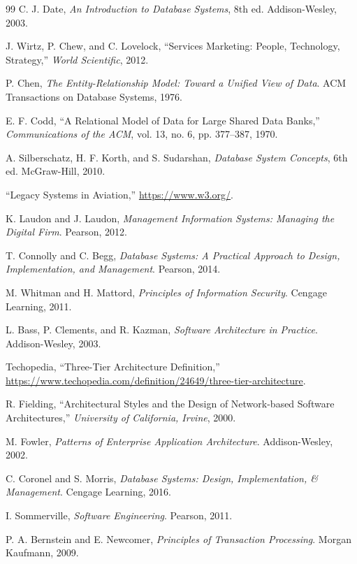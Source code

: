 \documentclass[12pt, a4paper]{article}
\begin{document}
\begin{thebibliography}{99}
		 C. J. Date, \textit{An Introduction to Database Systems}, 8th ed. Addison-Wesley, 2003.
		
		 J. Wirtz, P. Chew, and C. Lovelock, ``Services Marketing: People, Technology, Strategy,'' \textit{World Scientific}, 2012.
		
		 P. Chen, \textit{The Entity-Relationship Model: Toward a Unified View of Data}. ACM Transactions on Database Systems, 1976.
		
		 E. F. Codd, ``A Relational Model of Data for Large Shared Data Banks,'' \textit{Communications of the ACM}, vol. 13, no. 6, pp. 377--387, 1970.
		
		 A. Silberschatz, H. F. Korth, and S. Sudarshan, \textit{Database System Concepts}, 6th ed. McGraw-Hill, 2010.
		
		 ``Legacy Systems in Aviation,'' \url{https://www.w3.org/}.
		
		 K. Laudon and J. Laudon, \textit{Management Information Systems: Managing the Digital Firm}. Pearson, 2012.
		
		 T. Connolly and C. Begg, \textit{Database Systems: A Practical Approach to Design, Implementation, and Management}. Pearson, 2014.
		
		 M. Whitman and H. Mattord, \textit{Principles of Information Security}. Cengage Learning, 2011.
		
		 L. Bass, P. Clements, and R. Kazman, \textit{Software Architecture in Practice}. Addison-Wesley, 2003.
		
		 Techopedia, ``Three-Tier Architecture Definition,'' \url{https://www.techopedia.com/definition/24649/three-tier-architecture}.
		
		 R. Fielding, ``Architectural Styles and the Design of Network-based Software Architectures,'' \textit{University of California, Irvine}, 2000.
		
		 M. Fowler, \textit{Patterns of Enterprise Application Architecture}. Addison-Wesley, 2002.
		
		 C. Coronel and S. Morris, \textit{Database Systems: Design, Implementation, \& Management}. Cengage Learning, 2016.
		
		 I. Sommerville, \textit{Software Engineering}. Pearson, 2011.
		
		 P. A. Bernstein and E. Newcomer, \textit{Principles of Transaction Processing}. Morgan Kaufmann, 2009.
		

\end{thebibliography}
\end{document}
